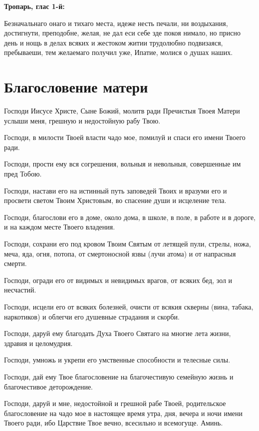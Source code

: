 \bfseries Тропарь, глас 1-й:\normalfont{}\nopagebreak


Безначальнаго онаго и тихаго места, идеже несть печали, ни воздыхания, достигнути, преподобне, желая, не дал еси себе зде покоя нимало, но присно день и нощь в делах всяких и жестоком житии трудолюбно подвизаяся, пребываеши, тем желаемаго получил уже, Ипатие, молися о душах наших.\mychapterending


 

\section{Благословение матери}
 


Господи Иисусе Христе, Сыне Божий, молитв ради Пречистыя Твоея Матери услыши меня, грешную и недостойную рабу Твою.

Господи, в милости Твоей власти чадо мое, помилуй и спаси его имени Твоего ради.

Господи, прости ему вся согрешения, вольныя и невольныя, совершенные им пред Тобою.

Господи, настави его на истинный путь заповедей Твоих и вразуми его и просвети светом Твоим Христовым, во спасение души и исцеление тела.

Господи, благослови его в доме, около дома, в школе, в поле, в работе и в дороге, и на каждом месте Твоего владения.

Господи, сохрани его под кровом Твоим Святым от летящей пули, стрелы, ножа, меча, яда, огня, потопа, от смертоносной язвы (лучи атома) и от напрасныя смерти.

Господи, огради его от видимых и невидимых врагов, от всяких бед, зол и несчастий.

Господи, исцели его от всяких болезней, очисти от всякия скверны (вина, табака, наркотиков) и облегчи его душевные страдания и скорби.

Господи, даруй ему благодать Духа Твоего Святаго на многие лета жизни, здравия и целомудрия.

Господи, умножь и укрепи его умственные способности и телесные силы.

Господи, дай ему Твое благословение на благочестивую семейную жизнь и благочестивое деторождение.

Господи, даруй и мне, недостойной и грешной рабе Твоей, родительское благословение на чадо мое в настоящее время утра, дня, вечера и ночи имени Твоего ради, ибо Царствие Твое вечно, всесильно и всемогуще. Аминь.


